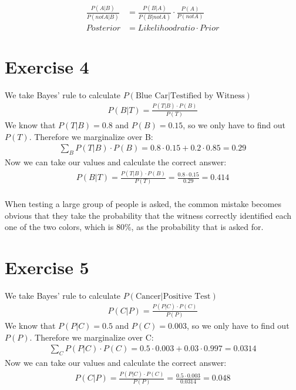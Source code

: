 \begin{align}
\frac{P(A|B)}{P(not A|B)} & = \frac{P(B|A)}{P(B|not A)} \cdot \frac{P(A)}{P(not A)} \\
Posterior & = Likelihoodratio \cdot Prior
\end{align}

\setcounter{equation}{0}
\section*{Exercise 4}

We take Bayes' rule to calculate $P(\mbox{Blue Car}|\mbox{Testified by Witness})$
\begin{align}
P(B|T) = \frac{P(T|B) \cdot P(B)}{P(T)}
\end{align}
We know that $P(T|B) = 0.8$ and $P(B) = 0.15$, so we only have to find out $P(T)$. Therefore we marginalize over B:
\begin{align}
\sum_{B}{P(T|B) \cdot P(B)} = 0.8 \cdot 0.15 + 0.2 \cdot 0.85 = 0.29
\end{align}
Now we can take our values and calculate the correct answer:
\begin{align}
P(B|T) = \frac{P(T|B) \cdot P(B)}{P(T)} = \frac{0.8 \cdot 0.15}{0.29} = 0.414
\end{align}
\\
When testing a large group of people is asked, the common mistake becomes obvious that they take the probability that the witness correctly identified each one of the two colors, which is 80\%, as the probability that is asked for.

\setcounter{equation}{0}
\section*{Exercise 5}

We take Bayes' rule to calculate $P(\mbox{Cancer}|\mbox{Positive Test})$
\begin{align}
P(C|P) = \frac{P(P|C) \cdot P(C)}{P(P)}
\end{align}
We know that $P(P|C) = 0.5$ and $P(C) = 0.003$, so we only have to find out $P(P)$. Therefore we marginalize over C:
\begin{align}
\sum_{C}{P(P|C) \cdot P(C)} = 0.5 \cdot 0.003 + 0.03 \cdot 0.997 = 0.0314
\end{align}
Now we can take our values and calculate the correct answer:
\begin{align}
P(C|P) = \frac{P(P|C) \cdot P(C)}{P(P)} = \frac{0.5 \cdot 0.003}{0.0314} = 0.048
\end{align}

